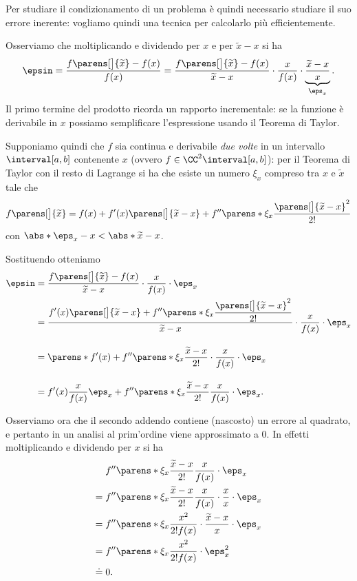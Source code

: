 Per studiare il condizionamento di un problema è quindi necessario studiare il suo errore inerente: vogliamo quindi una tecnica per calcolarlo più efficientemente.

Osserviamo che moltiplicando e dividendo per $x$ e per $\tilde x - x$ si ha \begin{align*}
    \epsin = \frac{f\parens[\big]{\tilde x} - f(x)}{f(x)}
    = \frac{f\parens[\big]{\tilde x} - f(x)}{\tilde x - x} \cdot \frac{x}{f(x)} \cdot \underbrace{\frac{\tilde x - x}{x}}_{\eps_x}.    
\end{align*} Il primo termine del prodotto ricorda un rapporto incrementale: se la funzione è derivabile in $x$ possiamo semplificare l'espressione usando il Teorema di Taylor.

Supponiamo quindi che $f$ sia continua e derivabile \emph{due volte} in un intervallo $\interval[{a, b}]$ contenente $x$ (ovvero $f \in \CC^2\interval[{a, b}]$): per il Teorema di Taylor con il resto di Lagrange si ha che esiste un numero $\xi_x$ compreso tra $x$ e $\tilde x$ tale che \[
    f\parens[\big]{\tilde x} = f(x) + f'(x)\parens[\big]{\tilde x - x} + f''\parens*{\xi_x}\frac{\parens[\big]{\tilde x - x}^2}{2!}
\] con $\abs*{\eps_x - x} < \abs*{\tilde x - x}$. 

Sostituendo otteniamo \begin{align*}
    \epsin &=  \frac{f\parens[\big]{\tilde x} - f(x)}{\tilde x - x} \cdot \frac{x}{f(x)} \cdot \eps_x\\
    &= \frac{\displaystyle f'(x)\parens[\big]{\tilde x - x} + f''\parens*{\xi_x}\frac{\parens[\big]{\tilde x - x}^2}{2!}}{\tilde x - x} \cdot \frac{x}{f(x)} \cdot \eps_x\\[1em]
    &= \parens*{f'(x) + f''\parens*{\xi_x}\frac{\tilde x - x}{2!}} \cdot \frac{x}{f(x)} \cdot \eps_x\\[1em]
    &= f'(x) \frac{x}{f(x)} \eps_x + f''\parens*{\xi_x}\frac{\tilde x - x}{2!}\frac{x}{f(x)} \cdot \eps_x. 
\end{align*}

Osserviamo ora che il secondo addendo contiene (nascosto) un errore al quadrato, e pertanto in un analisi al prim'ordine viene approssimato a $0$. In effetti moltiplicando e dividendo per $x$ si ha \begin{align*}
    &f''\parens*{\xi_x}\frac{\tilde x - x}{2!}\frac{x}{f(x)} \cdot \eps_x \\
    = {}&f''\parens*{\xi_x}\frac{\tilde x - x}{2!}\frac{x}{f(x)} \cdot \frac{x}{x} \cdot \eps_x \\
    = {}&f''\parens*{\xi_x}\frac{x^2}{2!f(x)} \cdot \frac{\tilde x - x}{x} \cdot \eps_x \\
    = {}&f''\parens*{\xi_x}\frac{x^2}{2!f(x)} \cdot \eps_x^2\\
    \doteq {}& 0.
\end{align*}

